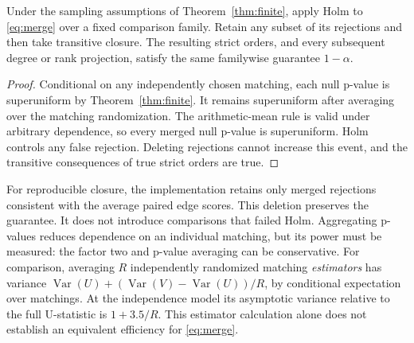 \begin{proposition}\label{prop:merge}
Under the sampling assumptions of Theorem~\ref{thm:finite}, apply Holm to \eqref{eq:merge} over a fixed comparison family. Retain any subset of its rejections and then take transitive closure. The resulting strict orders, and every subsequent degree or rank projection, satisfy the same familywise guarantee $1-\alpha$.
\end{proposition}
\begin{proof}
Conditional on any independently chosen matching, each null p-value is superuniform by Theorem~\ref{thm:finite}. It remains superuniform after averaging over the matching randomization. The arithmetic-mean rule is valid under arbitrary dependence, so every merged null p-value is superuniform. Holm controls any false rejection. Deleting rejections cannot increase this event, and the transitive consequences of true strict orders are true.
\end{proof}
For reproducible closure, the implementation retains only merged rejections consistent with the average paired edge scores. This deletion preserves the guarantee. It does not introduce comparisons that failed Holm. Aggregating p-values reduces dependence on an individual matching, but its power must be measured: the factor two and p-value averaging can be conservative. For comparison, averaging $R$ independently randomized matching \emph{estimators} has variance $\operatorname{Var}(U)+(\operatorname{Var}(V)-\operatorname{Var}(U))/R$, by conditional expectation over matchings. At the independence model its asymptotic variance relative to the full U-statistic is $1+3.5/R$. This estimator calculation alone does not establish an equivalent efficiency for \eqref{eq:merge}.

